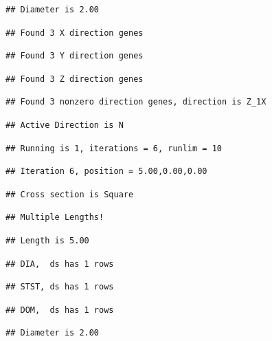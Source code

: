 \documentclass[]{article}
\begin{document}
\begin{verbatim}
## Diameter is 2.00
\end{verbatim}

\begin{verbatim}
## Found 3 X direction genes
\end{verbatim}

\begin{verbatim}
## Found 3 Y direction genes
\end{verbatim}

\begin{verbatim}
## Found 3 Z direction genes
\end{verbatim}

\begin{verbatim}
## Found 3 nonzero direction genes, direction is Z_1X
\end{verbatim}

\begin{verbatim}
## Active Direction is N
\end{verbatim}

\begin{verbatim}
## Running is 1, iterations = 6, runlim = 10
\end{verbatim}

\begin{verbatim}
## Iteration 6, position = 5.00,0.00,0.00
\end{verbatim}

\begin{verbatim}
## Cross section is Square
\end{verbatim}

\begin{verbatim}
## Multiple Lengths!
\end{verbatim}

\begin{verbatim}
## Length is 5.00
\end{verbatim}

\begin{verbatim}
## DIA,  ds has 1 rows
\end{verbatim}

\begin{verbatim}
## STST, ds has 1 rows
\end{verbatim}

\begin{verbatim}
## DOM,  ds has 1 rows
\end{verbatim}

\begin{verbatim}
## Diameter is 2.00
\end{verbatim}
\end{document}
